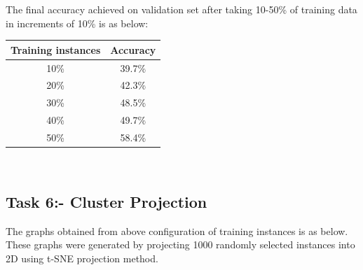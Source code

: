 \documentclass{article}
\begin{document}
The final accuracy achieved on validation set after taking 10-50\% of training data in increments of 10\% is as below:
\begin{table}[!htb]
	\centering
	\begin{tabular}{|c|c|}
		\hline
		Training instances & Accuracy\\
		\hline
		10\% & 39.7\%\\
		20\% & 42.3\%\\
		30\% & 48.5\%\\
		40\% & 49.7\%\\
		50\% & 58.4\%\\
		\hline
	\end{tabular}
\end{table}\\

\subsection{Task 6:- Cluster Projection}
The graphs obtained from above configuration of training instances is as below. These graphs were generated by projecting 1000 randomly selected instances into 2D using t-SNE projection method.
\end{document}
